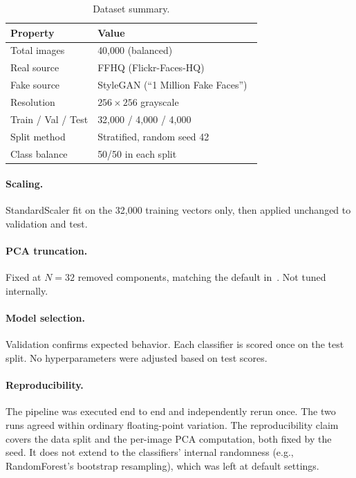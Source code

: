 \documentclass[runningheads]{llncs}
\begin{document}
\begin{table}[t]
\centering
\caption{Dataset summary.}
\label{tab:dataset}
\small
\begin{tabular}{@{}ll@{}}
\toprule
Property & Value \\
\midrule
Total images & 40,000 (balanced) \\
Real source & FFHQ (Flickr-Faces-HQ)~\cite{karras2019} \\
Fake source & StyleGAN (``1 Million Fake Faces'')~\cite{tunguz2026} \\
Resolution & $256 \times 256$ grayscale \\
Train / Val / Test & 32,000 / 4,000 / 4,000 \\
Split method & Stratified, random seed 42 \\
Class balance & 50/50 in each split \\
\bottomrule
\end{tabular}
\end{table}

\paragraph{Scaling.} StandardScaler fit on the 32,000 training vectors only, then applied unchanged to validation and test.

\paragraph{PCA truncation.} Fixed at $N = 32$ removed components, matching the default in~\cite{xie2026}. Not tuned internally.

\paragraph{Model selection.} Validation confirms expected behavior. Each classifier is scored once on the test split. No hyperparameters were adjusted based on test scores.

\paragraph{Reproducibility.} The pipeline was executed end to end and independently rerun once. The two runs agreed within ordinary floating-point variation. The reproducibility claim covers the data split and the per-image PCA computation, both fixed by the seed. It does not extend to the classifiers' internal randomness (e.g., RandomForest's bootstrap resampling), which was left at default settings.
\end{document}
